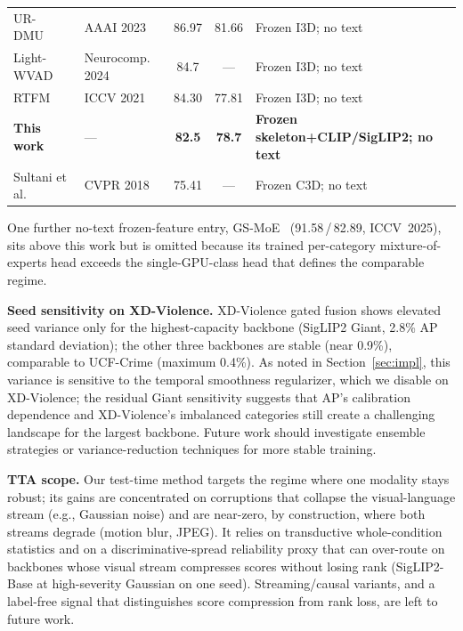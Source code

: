 \documentclass[sigconf]{acmart}
\begin{document}
\begin{table}[t]
\begin{tabular}{l l c c l}
UR-DMU~\cite{zhou2023urdmu}      & AAAI 2023       & 86.97 & 81.66 & Frozen I3D; no text \\
Light-WVAD~\cite{wang2024lightwvad} & Neurocomp. 2024 & 84.7  & ---   & Frozen I3D; no text \\
RTFM~\cite{tian2021rtfm}         & ICCV 2021       & 84.30 & 77.81 & Frozen I3D; no text \\
\textbf{This work}               & ---             & \textbf{82.5} & \textbf{78.7} & \textbf{Frozen skeleton+CLIP/SigLIP2; no text} \\
Sultani et al.~\cite{sultani2018ucfcrime} & CVPR 2018 & 75.41 & ---   & Frozen C3D; no text \\
\bottomrule
\end{tabular}

\vspace{2pt}
{\footnotesize One further no-text frozen-feature entry, GS-MoE~\cite{damicantonio2025gsmoe} (91.58\,/\,82.89, ICCV~2025), sits above this work but is omitted because its trained per-category mixture-of-experts head exceeds the single-GPU-class head that defines the comparable regime.}
\end{table}

\textbf{Seed sensitivity on XD-Violence.} XD-Violence gated fusion shows elevated seed variance only for the highest-capacity backbone (SigLIP2 Giant, 2.8\% AP standard deviation); the other three backbones are stable (near 0.9\%), comparable to UCF-Crime (maximum 0.4\%). As noted in Section~\ref{sec:impl}, this variance is sensitive to the temporal smoothness regularizer, which we disable on XD-Violence; the residual Giant sensitivity suggests that AP's calibration dependence and XD-Violence's imbalanced categories still create a challenging landscape for the largest backbone. Future work should investigate ensemble strategies or variance-reduction techniques for more stable training.

\textbf{TTA scope.} Our test-time method targets the regime where one modality stays robust; its gains are concentrated on corruptions that collapse the visual-language stream (e.g., Gaussian noise) and are near-zero, by construction, where both streams degrade (motion blur, JPEG). It relies on transductive whole-condition statistics and on a discriminative-spread reliability proxy that can over-route on backbones whose visual stream compresses scores without losing rank (SigLIP2-Base at high-severity Gaussian on one seed). Streaming/causal variants, and a label-free signal that distinguishes score compression from rank loss, are left to future work.
\end{document}
